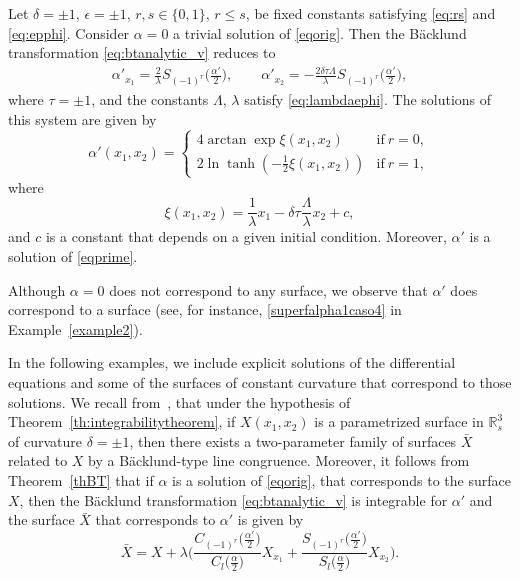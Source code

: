 \documentclass[pdftex]{sigma}
\numberwithin{equation}{section}
\begin{document}
\begin{Example}\label{example1} Let $\delta=\pm 1$, $\epsilon=\pm 1$,
$r,s\in \{0,1\}$, $r\leq s$, be fixed constants satisfying \eqref{eq:rs} and \eqref{eq:epphi}. Consider $\alpha=0$ a trivial solution of \eqref{eqorig}. Then the B\"acklund transformation \eqref{eq:btanalytic_v} reduces to
\begin{gather*}
\alpha'_{x_1}=\frac{2}{\lambda}S_{(-1)^r} \biggl(\frac{\alpha'}{2}\biggr),\qquad
\alpha'_{x_2}=-\frac{2\delta\tau\Lambda}{\lambda} S_{(-1)^r}\biggl(\frac{\alpha'}{2}\biggr),
\end{gather*}
where $\tau=\pm 1$, and the constants $\Lambda$, $\lambda$ satisfy \eqref{eq:lambdaephi}. The solutions of this system are given by
\begin{equation}\label{eq:BToftrivialsolution}
\alpha'(x_1,x_2)=\begin{cases}
4\arctan \exp\xi(x_1,x_2)&\mbox{if} \ r=0,\\
2\ln\tanh\left(-\frac{1}{2}\xi(x_1,x_2)\right)&\mbox{if} \ r=1,
\end{cases}
\end{equation}
where
\[
\xi(x_1,x_2)=\frac{1}{\lambda}x_1-\delta\tau\frac{\Lambda}{\lambda}x_2+c,
\]
and $c$ is a constant that depends on a given initial condition.
Moreover, $\alpha'$ is a solution of \eqref{eqprime}.
\end{Example}

Although $\alpha=0$ does not correspond to any surface, we observe that $\alpha'$ does correspond to a surface (see, for instance, \eqref{superfalpha1caso4} in Example~\ref{example2}).

In the following examples, we include explicit solutions of the differential equations
and some of the surfaces of constant curvature that correspond to those solutions.
We recall from~\cite{KRT2022}, that under the hypothesis of Theorem~\ref{th:integrabilitytheorem}, if $X(x_1,x_2)$ is a parametrized surface in ${\mathbb{R}}^3_s$ of curvature $\delta=\pm 1$, then there exists a two-parameter family of surfaces $\bar{X}$
related to $X$ by a B\"acklund-type line congruence. Moreover, it follows from Theorem~\ref{thBT} that if
$\alpha$ is a solution of \eqref{eqorig}, that corresponds to the surface $X$, then the B\"acklund transformation \eqref{eq:btanalytic_v} is integrable for $\alpha'$ and the surface $\bar{X}$ that corresponds to $\alpha'$ is given by
\begin{equation*}%
\bar{X}=X+\lambda
\Biggl(
\frac{C_{(-1)^r}\bigl(\frac{\alpha'}{2}\bigr)}{C_l\bigl(\frac{\alpha}{2}\bigr)}X_{x_1}
+
\frac{S_{(-1)^r}\bigl(\frac{\alpha'}{2}\bigr)}{S_l\bigl(\frac{\alpha}{2}\bigr)}X_{x_2}
\Biggr).
\end{equation*}
\end{document}
